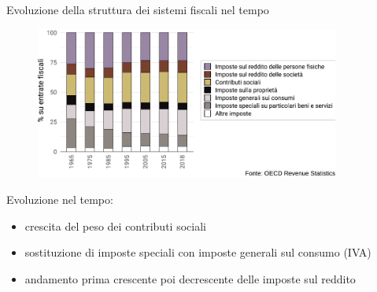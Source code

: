 \documentclass[aspectratio=64,11pt]{beamer}
\begin{document}
\begin{frame}{Evoluzione della struttura dei sistemi fiscali nel tempo}
\begin{figure}[htbp]
\centering
\includegraphics[height=5cm]{./figure/evoluzione-composizione-entrate-OCSE-color.pdf}
\end{figure}

Evoluzione nel tempo:
\begin{itemize}
\item crescita del peso dei contributi sociali
\item sostituzione di imposte speciali con imposte generali sul consumo (IVA)
\item andamento prima crescente poi decrescente delle imposte sul reddito
\end{itemize}
\end{frame}
\end{document}
